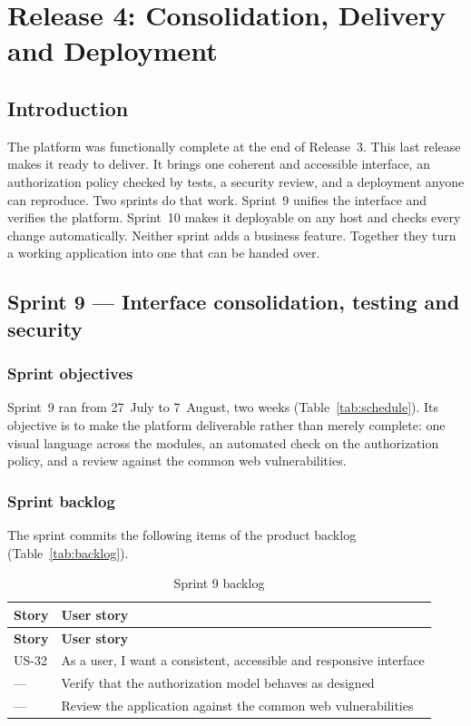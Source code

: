 \chapter{Release 4: Consolidation, Delivery and Deployment}

\section*{Introduction}
The platform was functionally complete at the end of Release~3. This last release makes it ready
to deliver. It brings one coherent and accessible interface, an authorization policy checked by
tests, a security review, and a deployment anyone can reproduce. Two sprints do that work.
Sprint~9 unifies the interface and verifies the platform. Sprint~10 makes it deployable on any
host and checks every change automatically. Neither sprint adds a business feature. Together they
turn a working application into one that can be handed over.
\section{Sprint 9 --- Interface consolidation, testing and security}

\subsection{Sprint objectives}
Sprint~9 ran from 27~July to 7~August, two weeks (Table~\ref{tab:schedule}). Its objective is to
make the platform deliverable rather than merely complete: one visual language across the modules,
an automated check on the authorization policy, and a review against the common web
vulnerabilities.

\subsection{Sprint backlog}
The sprint commits the following items of the product backlog (Table~\ref{tab:backlog}).

\begin{longtable}{|m{1.6cm}|m{12.4cm}|}
\caption{Sprint 9 backlog}\label{tab:sb9}\\
\hline
\textbf{Story} & \textbf{User story} \\
\hline
\endfirsthead
\hline
\textbf{Story} & \textbf{User story} \\
\hline
\endhead
\endfoot
\endlastfoot
\hline
US-32 & As a user, I want a consistent, accessible and responsive interface \\
\hline
--- & Verify that the authorization model behaves as designed \\
\hline
--- & Review the application against the common web vulnerabilities \\
\hline
\end{longtable}


